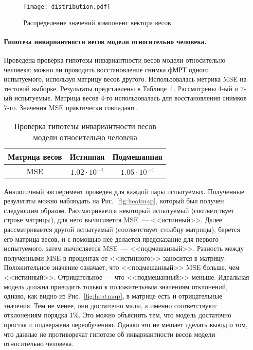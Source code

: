 \documentclass[a4paper, 12pt]{extarticle}
\begin{document}
\begin{figure}[h!]
	\centering
	\texttt{[image: distribution.pdf]}
	\caption{Распределение значений компонент вектора весов}
	\label{fig:w-distr}
\end{figure}

\paragraph*{Гипотеза инвариантности весов модели относительно человека.}

Проведена проверка гипотезы инвариантности весов модели относительно человека:
можно ли проводить восстановление снимка фМРТ одного испытуемого, используя
матрицу весов другого. Использовалась метрика MSE на тестовой выборке.
Результаты представлены в Таблице~\ref{table:inv}.
Рассмотрены 4-ый и 7-ый испытуемые. Матрица весов 4-го использовалась для восстановления
снимков 7-го.
Значения MSE практически совпадают. 

\begin{table}[h!]
	\centering
	\caption{Проверка гипотезы инвариантности весов модели относительно человека}
	\begin{tabular}{|c|c|c|}
		\hline
		Матрица весов & Истинная             & Подмешанная          \\ \hline \hline
		MSE           & $1.02 \cdot 10^{-4}$ & $1.05 \cdot 10^{-4}$ \\ \hline
	\end{tabular}
	\label{table:inv}
\end{table}

Аналогичный эксперимент проведен для каждой пары испытуемых.
Полученные результаты можно наблюдать на Рис.~\ref{fig:heatmap},
который был получен следующим образом.
Рассматривается некоторый испытуемый (соответствует строке матрицы), 
для него вычисляется MSE~--- <<истинный>>.
Далее рассматривается другой испытуемый (соответствует столбцу матрицы),
берется его матрица весов, и с помощью нее делается предсказание для первого 
испытуемого, затем вычисляется MSE~--- <<подмешанный>>. 
Разность между полученными MSE в процентах от <<истинного>> заносится в матрицу.
Положительное значение означает, что <<подмешанный>> MSE больше, чем <<истинный>>.
Отрицательное~--- что <<подмешанный>> меньше.
Идеальная модель должна приводить только к положительным значениям отклонений, однако,
как видно из Рис.~\ref{fig:heatmap}, в матрице есть и отрицательные значения.
Тем не менее, они достаточно малы, а именно соответствуют отклонениям порядка 1\%.
Это можно объяснить тем, что модель достаточно простая и подвержена переобучению.
Однако это не мешает сделать вывод о том, что данные не противоречат гипотезе 
об инвариантности весов модели относительно человека.
\end{document}
